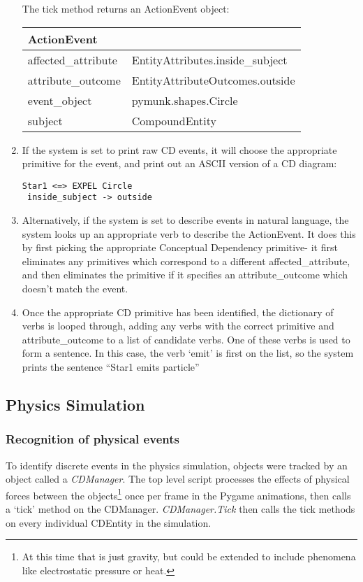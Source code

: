 \documentclass[dissertation.tex]{subfiles}
\begin{document}
\begin{enumerate}
    The tick method returns an ActionEvent object:

    \begin{tabular}{l l}
        \toprule
        \textbf{ActionEvent}\\
        \midrule
        affected\_attribute & EntityAttributes.inside\_subject\\
        attribute\_outcome & EntityAttributeOutcomes.outside\\
        event\_object & pymunk.shapes.Circle\\
        subject & CompoundEntity\\
        \bottomrule
    \end{tabular}

    \item If the system is set to print raw CD events, it will choose the appropriate primitive for the event, and print out an ASCII version of a CD diagram:
    \begin{lstlisting}
Star1 <=> EXPEL Circle
 inside_subject -> outside
    \end{lstlisting}

    \item Alternatively, if the system is set to describe events in natural language, the system looks up an appropriate verb to describe the ActionEvent. It does this by first picking the appropriate Conceptual Dependency primitive- it first eliminates any primitives which correspond to a different affected\_attribute, and then eliminates the primitive if it specifies an attribute\_outcome which doesn't match the event.

    \item Once the appropriate CD primitive has been identified, the dictionary of verbs is looped through, adding any verbs with the correct primitive and attribute\_outcome to a list of candidate verbs. One of these verbs is used to form a sentence. In this case, the verb `emit' is first on the list, so the system prints the sentence ``Star1 emits particle''

    \end{enumerate}

    \subsection{Physics Simulation}
    \subsubsection{Recognition of physical events}
    To identify discrete events in the physics simulation, objects were tracked by an object called a \textit{CDManager}. The top level script processes the effects of physical forces between the objects\footnote{At this time that is just gravity, but could be extended to include phenomena like electrostatic pressure or heat.} once per frame in the Pygame animations, then calls a `tick' method on the CDManager. \textit{CDManager.Tick} then calls the tick methods on every individual CDEntity in the simulation.
\end{document}

